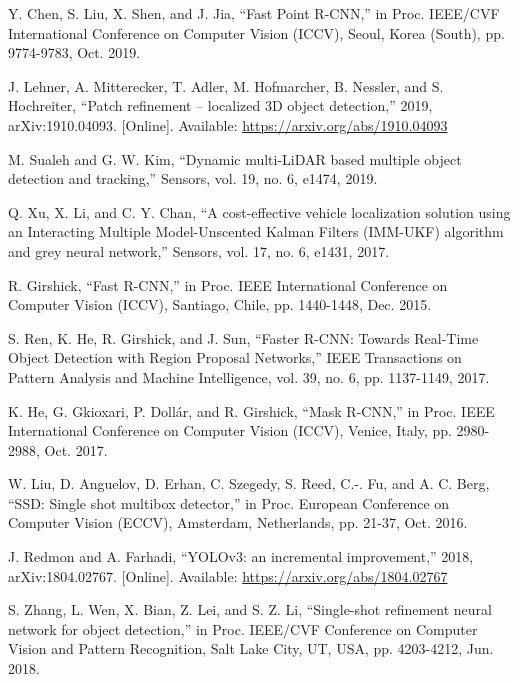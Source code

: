 \documentclass{ieeeaccess}
\begin{document}
\begin{thebibliography}{00}

 Y. Chen, S. Liu, X. Shen, and J. Jia, ``Fast Point R-CNN,'' in Proc. IEEE/CVF International Conference on Computer Vision (ICCV), Seoul, Korea (South), pp. 9774-9783, Oct. 2019.

 J. Lehner, A. Mitterecker, T. Adler, M. Hofmarcher, B. Nessler, and S. Hochreiter, ``Patch refinement -- localized 3D object detection,'' 2019,  arXiv:1910.04093. [Online]. Available: \underline{https://arxiv.org/abs/1910.04093}

 M. Sualeh and G. W. Kim, ``Dynamic multi-LiDAR based multiple object detection and tracking,'' Sensors, vol. 19, no. 6, e1474, 2019.

 Q. Xu, X. Li, and C. Y. Chan, ``A cost-effective vehicle localization solution using an Interacting Multiple Model-Unscented Kalman Filters (IMM-UKF) algorithm and grey neural network,'' Sensors, vol. 17, no. 6, e1431, 2017.

 R. Girshick, ``Fast R-CNN,'' in Proc. IEEE International Conference on Computer Vision (ICCV), Santiago, Chile, pp. 1440-1448, Dec. 2015.

 S. Ren, K. He, R. Girshick, and J. Sun, ``Faster R-CNN: Towards Real-Time Object Detection with Region Proposal Networks,'' IEEE Transactions on Pattern Analysis and Machine Intelligence, vol. 39, no. 6, pp. 1137-1149, 2017.

 K. He, G. Gkioxari, P. Dollár, and R. Girshick, ``Mask R-CNN,'' in Proc. IEEE International Conference on Computer Vision (ICCV), Venice, Italy, pp. 2980-2988, Oct. 2017.

 W. Liu, D. Anguelov, D. Erhan, C. Szegedy, S. Reed, C.-. Fu, and A. C. Berg, ``SSD: Single shot multibox detector,'' in Proc. European Conference on Computer Vision (ECCV), Amsterdam, Netherlands, pp. 21-37, Oct. 2016.

 J. Redmon and A. Farhadi, ``YOLOv3: an incremental improvement,'' 2018, arXiv:1804.02767. [Online]. Available: \underline{https://arxiv.org/abs/1804.02767}

 S. Zhang, L. Wen, X. Bian, Z. Lei, and S. Z. Li, ``Single-shot refinement neural network for object detection,'' in Proc. IEEE/CVF Conference on Computer Vision and Pattern Recognition, Salt Lake City, UT, USA, pp. 4203-4212, Jun. 2018.


\end{thebibliography}
\end{document}
